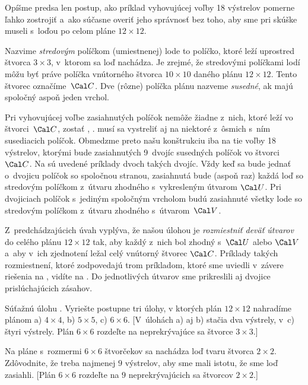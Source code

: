 {\Pozn
Opíšme predsa len postup, ako príklad vyhovujúcej
voľby 18 výstrelov pomerne ľahko zostrojiť a~ako súčasne overiť
jeho správnosť bez toho, aby sme pri skúške museli s~loďou
 po celom pláne $12\times12$.

Nazvime {\it stredovým\/} políčkom (umiestnenej) lode to políčko,
ktoré leží uprostred štvorca $3\times3$, v~ktorom sa loď nachádza. Je
zrejmé, že stredovými políčkami lodí môžu byť práve políčka vnútorného
štvorca $10\times10$ daného plánu $12\times12$. Tento štvorec
označíme~$\Cal C$. Dve (rôzne) políčka plánu nazveme {\it
susedné}, ak majú spoločný aspoň jeden vrchol.


Pri vyhovujúcej voľbe zasiahnutých políčok nemôže žiadne z~nich, ktoré
leží vo štvorci~$\Cal C$, zostať , \tj. musí sa
vystreliť aj na niektoré z~ôsmich s~ním susediacich políčok.
Obmedzme preto našu konštrukciu iba na tie voľby 18 výstrelov,
ktorými bude zasiahnutých 9~dvojíc susedných políčok vo štvorci
$\Cal C$. Na \obr{} sú uvedené príklady dvoch takých dvojíc.
Vždy keď sa bude jednať o~dvojicu políčok so spoločnou stranou,
zasiahnutá bude (aspoň raz) každá loď so stredovým
políčkom z~útvaru zhodného s~vykresleným útvarom $\Cal U$.
Pri dvojiciach políčok s~jediným spoločným vrcholom budú zasiahnuté
všetky lode so stredovým políčkom z~útvaru zhodného
s~útvarom~$\Cal V$.
%

Z~predchádzajúcich úvah vyplýva, že našou úlohou je
{\it rozmiestniť deväť útvarov} do celého
plánu $12\times12$ tak, aby každý z~nich bol zhodný
s~$\Cal U$ alebo $\Cal V$ a~aby v~ich zjednotení
ležal celý vnútorný štvorec $\Cal C$. Príklady takých
rozmiestnení, ktoré zodpovedajú trom príkladom, ktoré sme uviedli
v~závere riešenia na , vidíte na \obr. Do jednotlivých útvarov sme prikreslili aj dvojice prislúchajúcich zásahov.
%



Súťažnú úlohu . Vyriešte
postupne tri úlohy, v ktorých plán $12\times12$
nahradíme plánom a) $4\times4$, b) $5\times5$, c) $6\times6$.
[V~úlohách a) aj b) stačia dva výstrely, v~c) štyri výstrely.
Plán $6\times6$ rozdeľte na neprekrývajúce sa štvorce $3\times3$.]

\DOP
Na pláne s~rozmermi $6 \times 6$
štvorčekov sa nachádza loď tvaru štvorca $2\times2$. Zdôvodnite,
že treba najmenej $9$ výstrelov, aby sme mali istotu, že
sme loď zasiahli.
[Plán $6\times6$ rozdeľte na $9$ neprekrývajúcich sa štvorcov
$2\times2$.]

}
